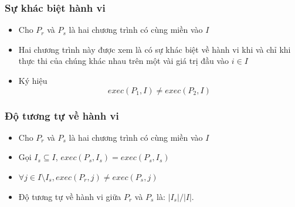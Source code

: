 \documentclass{beamer}
\begin{document}
\begin{frame}
  \frametitle{Sự khác biệt hành vi}
  \begin{block}{}
  \begin{itemize}
  	\item Cho $P_r$ và $P_s$ là hai chương trình có cùng miền vào $I$ 
  	\item Hai chương trình này được xem là có sự khác biệt về
  	hành vi khi và chỉ khi thực thi của chúng khác nhau trên một vài giá
  	trị đầu vào $i \in I$
  	\item Ký hiệu \[exec(P_{1}, I) \neq exec(P_{2}, I)\]
  \end{itemize}
  \end{block}
  

\end{frame}


\begin{frame}
  \frametitle{Độ tương tự về hành vi}
  \begin{block}{}
  	\begin{itemize}
  		\item Cho $P_r$ và $P_s$ là hai chương trình có cùng miền
  		vào $I$
  		\item Gọi $I_{s} \subseteq I$, $exec(P_s, I_{s}) = exec(P_s, I_{s})$ 
  		\item $\forall j \in I \setminus I_{s}, exec(P_r, j) \neq exec(P_s,
  		j)$
  		\item Độ tương tự về hành vi giữa $P_r$ và $P_s$ là: $|I_s|/|I|$.
  	\end{itemize}
  \end{block}
  
\end{frame}
\end{document}
